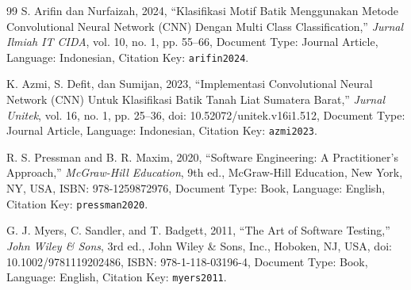 \documentclass[10pt,a4paper]{article}
\begin{document}
\begin{thebibliography}{99}
S. Arifin dan Nurfaizah, 2024, ``Klasifikasi Motif Batik Menggunakan Metode Convolutional Neural Network (CNN) Dengan Multi Class Classification,'' \textit{Jurnal Ilmiah IT CIDA}, vol. 10, no. 1, pp. 55--66, Document Type: Journal Article, Language: Indonesian, Citation Key: \texttt{arifin2024}.

K. Azmi, S. Defit, dan Sumijan, 2023, ``Implementasi Convolutional Neural Network (CNN) Untuk Klasifikasi Batik Tanah Liat Sumatera Barat,'' \textit{Jurnal Unitek}, vol. 16, no. 1, pp. 25--36, doi: 10.52072/unitek.v16i1.512, Document Type: Journal Article, Language: Indonesian, Citation Key: \texttt{azmi2023}.

R. S. Pressman and B. R. Maxim, 2020, ``Software Engineering: A Practitioner's Approach,'' \textit{McGraw-Hill Education}, 9th ed., McGraw-Hill Education, New York, NY, USA, ISBN: 978-1259872976, Document Type: Book, Language: English, Citation Key: \texttt{pressman2020}.

G. J. Myers, C. Sandler, and T. Badgett, 2011, ``The Art of Software Testing,'' \textit{John Wiley \& Sons}, 3rd ed., John Wiley \& Sons, Inc., Hoboken, NJ, USA, doi: 10.1002/9781119202486, ISBN: 978-1-118-03196-4, Document Type: Book, Language: English, Citation Key: \texttt{myers2011}.

\end{thebibliography}
\endgroup
\end{document}
